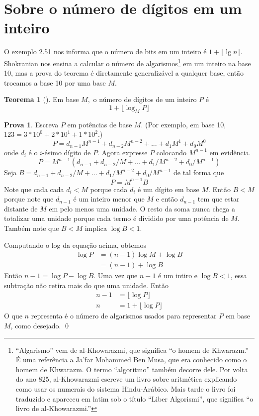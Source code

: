 \documentclass{article}
\theoremstyle{definition}
\newtheorem{theorem}{Teorema}[section]
\theoremstyle{pf}
\newtheorem*{pf}{Prova}
\newcommand{\thm}[1]{\jmp\begin{theorem}[#1]}
\newcommand{\mht}{\end{theorem}}
\newcommand{\prf}{\begin{pf}}
\newcommand{\frp}{\qed\end{pf}}
\newcommand{\jmp}{\vspace{3pt}}
\newcommand{\floor}[1]{\lfloor #1 \rfloor}
\begin{document}


\section{Sobre o número de dígitos em um inteiro}

O exemplo 2.51\cite[capítulo 2, página 58]{hac} nos informa que o
número de bits em um inteiro é $1 + \floor{\lg n}$.  Shokranian nos
ensina a calcular o número de algarismos\footnote{``Algarismo'' vem de
  al-Khowarazmi, que significa ``o homem de Khwarazm.''  É uma
  referência a Ja'far Mohammed Ben Musa, que era conhecido como o
  homem de Khwarazm.  O termo ``algoritmo'' também decorre dele.  Por
  volta do ano 825, al-Khowarazmi escreve um livro sobre aritmética
  explicando como usar os numerais do sistema Hindu-Arábico.  Mais
  tarde o livro foi traduzido e apareceu em latim sob o título ``Liber
  Algorismi'', que significa ``o livro de al-Khowarazmi.''\cite[página
    21]{eti}} em um inteiro na base 10\cite[página 13]{ss}, mas a
prova do teorema é diretamente generalizável a qualquer base, então
trocamos a base 10 por uma base $M$.

\thm{} \label{nbits} Em base $M,$ o número de dígitos de um inteiro $P$ é 
%
   $$1 + \floor{\log_M P}$$
%
\mht
\prf Escreva $P$ em potências de base $M$.  (Por exemplo, em base
10, $123 = 3*10^0 + 2*10^1 + 1*10^2$.)
%
   $$P = d_{n-1}M^{n-1} + d_{n-2}M^{n-2} + ... + d_{1}M^1 + d_{0}M^0$$
%
onde $d_i$ é o $i$-ésimo dígito de $P$.  Agora expresse $P$ colocando
$M^{n-1}$ em evidência.
%
   $$P = M^{n-1} (d_{n-1} + d_{n-2}/M + ... + d_{1}/M^{n-2} + d_{0}/M^{n-1})$$
%
Seja $B = d_{n-1} + d_{n-2}/M + ... + d_{1}/M^{n-2} + d_{0}/M^{n-1}$ de
tal forma que 
%
   $$P = M^{n-1} B$$
%
Note que cada cada $d_i < M$ porque cada $d_i$ é um dígito em base
$M$.  Então $B < M$ porque note que $d_{n-1}$ é um inteiro menor que
$M$ e então $d_{n-1}$ tem que estar distante de $M$ em pelo menos uma
unidade.  O resto da soma nunca chega a totalizar uma unidade porque
cada termo é dividido por uma potência de $M$.  Também note que 
$B < M$ implica $\log B < 1$.

Computando o log da equação acima, obtemos
%
\begin{align}
   \log P &= (n - 1) \log M + \log B\\
          &= (n - 1) + \log B
\end{align}
%
Então $n - 1 = \log P - \log B$.  Uma vez que $n - 1$ é um intiro e
$\log B < 1$, essa subtração não retira mais do que uma unidade.  Então
%
\begin{align}
    n - 1 &= \floor{\log P}\\
        n &= 1 + \floor{\log P}
\end{align}
%
O que $n$ representa é o número de algarismos usados para representar
$P$ em base $M$, como desejado.
\frp
\end{document}

